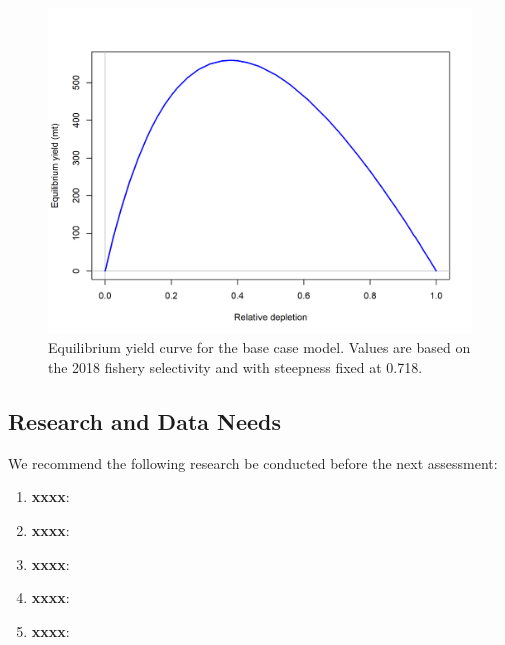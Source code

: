 \documentclass[12pt,]{article}
\begin{document}
\begin{figure}
\centering
\includegraphics{r4ss/plots_mod1/yield1_yield_curve.png}
\caption{Equilibrium yield curve for the base case model. Values are
based on the 2018 fishery selectivity and with steepness fixed at 0.718.
\label{fig:Yield_all}}
\end{figure}

\FloatBarrier

\newpage

\hypertarget{research-and-data-needs}{%
\subsection*{Research and Data Needs}\label{research-and-data-needs}}

We recommend the following research be conducted before the next
assessment:

\begin{enumerate}

\item \textbf{xxxx}: 

\item \textbf{xxxx}:

\item \textbf{xxxx}:

\item \textbf{xxxx}:

\item \textbf{xxxx}:

\end{enumerate}
\end{document}
